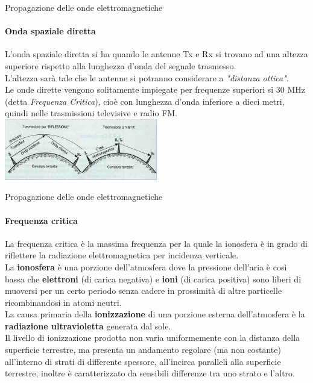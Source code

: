 \documentclass[aspectratio=169]{beamer}
\newcommand*{\vet}{\fontfamily{qzc}\selectfont}
\begin{document}
\begin{frame}{Propagazione delle onde elettromagnetiche}
		\framesubtitle{Onda spaziale diretta}
		L'onda spaziale diretta si ha quando le antenne {\vet Tx} e {\vet Rx} si trovano ad una altezza superiore rispetto alla lunghezza d'onda del segnale trasmesso.\\
		L'altezza sarà tale che le antenne si potranno considerare a \emph{"distanza ottica"}.\\
		Le onde dirette vengono solitamente impiegate per frequenze superiori si 30 MHz (detta \emph{Frequenza Critica}), cioè con lunghezza d'onda inferiore a dieci metri, quindi nelle trasmissioni televisive e radio FM.\\
		\medskip
		\centering
		 \includegraphics[width=0.5\textwidth]{Imgs/OndaDiretta}
\end{frame}

\begin{frame}{Propagazione delle onde elettromagnetiche}
	\framesubtitle{Frequenza critica}
	La frequenza critica è la massima frequenza per la quale la ionosfera è in grado di riflettere la radiazione elettromagnetica per incidenza verticale.\\
	\smallskip
	La \textbf{ionosfera} è una porzione dell'atmosfera dove la pressione dell'aria è così bassa che \textbf{elettroni} (di carica negativa) e \textbf{ioni} (di carica positiva) sono liberi di muoversi per un certo periodo senza cadere in prossimità di altre particelle ricombinandosi in atomi neutri.\\
	La causa primaria della \textbf{ionizzazione} di una porzione esterna dell'atmosfera è la \textbf{radiazione ultravioletta} generata dal sole.\\
	\smallskip
	Il livello di ionizzazione prodotta non varia uniformemente con la distanza della superficie terrestre, ma presenta un andamento regolare (ma non costante) all'interno di strati di differente spessore, all'incirca paralleli alla superficie terrestre, inoltre è caratterizzato da sensibili differenze tra uno strato e l'altro.\\ 
\end{frame}
\end{document}
